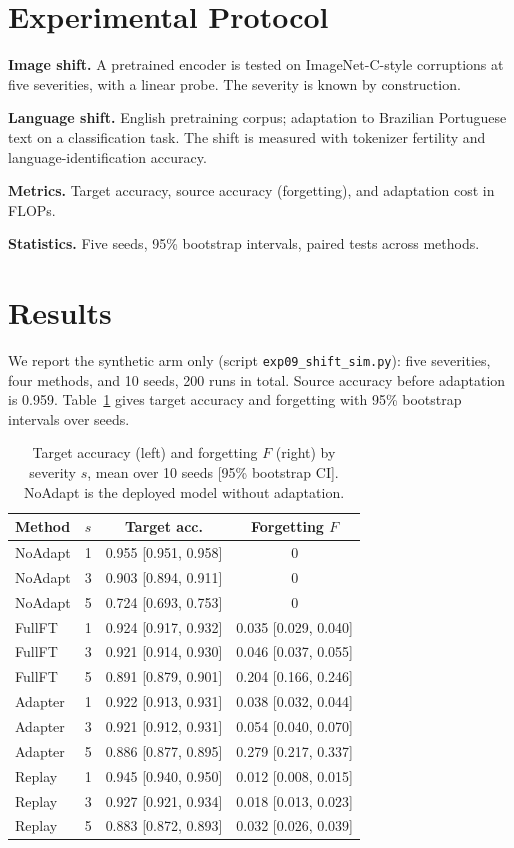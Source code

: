 \documentclass[conference]{IEEEtran}
\begin{document}
\section{Experimental Protocol}
\textbf{Image shift.} A pretrained encoder is tested on ImageNet-C-style corruptions at five severities, with a linear probe. The severity is known by construction.

\textbf{Language shift.} English pretraining corpus; adaptation to Brazilian Portuguese text on a classification task. The shift is measured with tokenizer fertility and language-identification accuracy.

\textbf{Metrics.} Target accuracy, source accuracy (forgetting), and adaptation cost in FLOPs.

\textbf{Statistics.} Five seeds, 95\% bootstrap intervals, paired tests across methods.

\section{Results}
We report the synthetic arm only (script \texttt{exp09\_shift\_sim.py}): five severities, four methods, and 10 seeds, 200 runs in total. Source accuracy before adaptation is 0.959. Table~\ref{tab:shift} gives target accuracy and forgetting with 95\% bootstrap intervals over seeds.

\begin{table}[!t]
\caption{Target accuracy (left) and forgetting $F$ (right) by severity $s$, mean over 10 seeds [95\% bootstrap CI]. NoAdapt is the deployed model without adaptation.}
\label{tab:shift}
\centering
\small
\begin{tabular}{llcc}
\hline
Method & $s$ & Target acc. & Forgetting $F$ \\
\hline
NoAdapt & 1 & 0.955 [0.951, 0.958] & 0 \\
NoAdapt & 3 & 0.903 [0.894, 0.911] & 0 \\
NoAdapt & 5 & 0.724 [0.693, 0.753] & 0 \\
FullFT  & 1 & 0.924 [0.917, 0.932] & 0.035 [0.029, 0.040] \\
FullFT  & 3 & 0.921 [0.914, 0.930] & 0.046 [0.037, 0.055] \\
FullFT  & 5 & 0.891 [0.879, 0.901] & 0.204 [0.166, 0.246] \\
Adapter & 1 & 0.922 [0.913, 0.931] & 0.038 [0.032, 0.044] \\
Adapter & 3 & 0.921 [0.912, 0.931] & 0.054 [0.040, 0.070] \\
Adapter & 5 & 0.886 [0.877, 0.895] & 0.279 [0.217, 0.337] \\
Replay  & 1 & 0.945 [0.940, 0.950] & 0.012 [0.008, 0.015] \\
Replay  & 3 & 0.927 [0.921, 0.934] & 0.018 [0.013, 0.023] \\
Replay  & 5 & 0.883 [0.872, 0.893] & 0.032 [0.026, 0.039] \\
\hline
\end{tabular}
\end{table}
\end{document}
